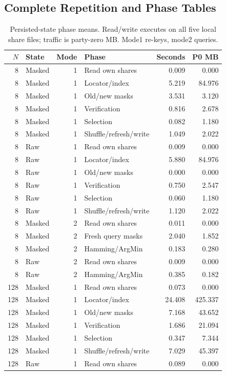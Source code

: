 \subsection{Complete Repetition and Phase Tables}

\begin{table}[H]
\caption{Persisted-state phase means. Read/write executes on all five local share files; traffic is party-zero MB. Mode1 re-keys, mode2 queries.}
\label{tab:persisted_phases0}\centering\small
\setlength{\tabcolsep}{3pt}
\begin{tabular}{rlrlrr}
\toprule
$N$ & State & Mode & Phase & Seconds & P0 MB \\
\midrule
8 & Masked & 1 & Read own shares & 0.009 & 0.000 \\
8 & Masked & 1 & Locator/index & 5.219 & 84.976 \\
8 & Masked & 1 & Old/new masks & 3.531 & 3.120 \\
8 & Masked & 1 & Verification & 0.816 & 2.678 \\
8 & Masked & 1 & Selection & 0.082 & 1.180 \\
8 & Masked & 1 & Shuffle/refresh/write & 1.049 & 2.022 \\
8 & Raw & 1 & Read own shares & 0.009 & 0.000 \\
8 & Raw & 1 & Locator/index & 5.880 & 84.976 \\
8 & Raw & 1 & Old/new masks & 0.000 & 0.000 \\
8 & Raw & 1 & Verification & 0.750 & 2.547 \\
8 & Raw & 1 & Selection & 0.060 & 1.180 \\
8 & Raw & 1 & Shuffle/refresh/write & 1.120 & 2.022 \\
8 & Masked & 2 & Read own shares & 0.011 & 0.000 \\
8 & Masked & 2 & Fresh query masks & 2.040 & 1.852 \\
8 & Masked & 2 & Hamming/ArgMin & 0.183 & 0.280 \\
8 & Raw & 2 & Read own shares & 0.009 & 0.000 \\
8 & Raw & 2 & Hamming/ArgMin & 0.385 & 0.182 \\
128 & Masked & 1 & Read own shares & 0.073 & 0.000 \\
128 & Masked & 1 & Locator/index & 24.408 & 425.337 \\
128 & Masked & 1 & Old/new masks & 7.168 & 43.652 \\
128 & Masked & 1 & Verification & 1.686 & 21.094 \\
128 & Masked & 1 & Selection & 0.347 & 7.344 \\
128 & Masked & 1 & Shuffle/refresh/write & 7.029 & 45.397 \\
128 & Raw & 1 & Read own shares & 0.089 & 0.000 \\
\bottomrule
\end{tabular}
\end{table}

